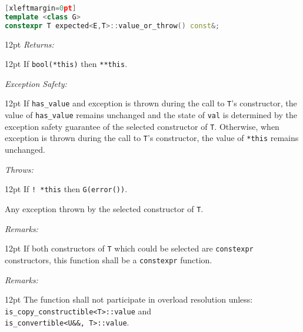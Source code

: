 \documentclass[a4paper,10pt]{article}
\newcommand{\cpp}[1]{\lstinline{#1}}
\newcommand{\wordingItem}[1]{\noindent\textit{#1:}}
\newenvironment{wordingTextItem}[1]{\wordingItem{#1}\vspace{2pt}\noindent\begin{adjustwidth}{12pt}{}}{\vspace{2pt}\end{adjustwidth}}
\newenvironment{wordingPara}{\begin{adjustwidth}{12pt}{}}{\end{adjustwidth}}
\begin{document}
\begin{lstlisting}[language=C++][xleftmargin=0pt]
template <class G>
constexpr T expected<E,T>::value_or_throw() const&; 
\end{lstlisting}
\begin{wordingPara}
\begin{wordingTextItem}{Returns}
If \cpp{bool(*this)} then \cpp{**this}.
\end{wordingTextItem}
\begin{wordingTextItem}{Exception Safety}
If \cpp{has_value} and exception is thrown during the call to \cpp{T}'s constructor, the value of \cpp{has_value} remains unchanged and the state of \cpp{val} is determined by the exception safety guarantee of the selected constructor of \cpp{T}. Otherwise, when exception is thrown during the call to \cpp{T}'s constructor, the value of \cpp{*this} remains unchanged.
\end{wordingTextItem}
\begin{wordingTextItem}{Throws}
If \cpp{! *this} then \cpp{G(error())}.

\noindent
Any exception thrown by the selected constructor of \cpp{T}.
\end{wordingTextItem}
\begin{wordingTextItem}{Remarks}
If both constructors of \cpp{T} which could be selected are \cpp{constexpr} constructors, this function shall be a \cpp{constexpr} function.
\end{wordingTextItem}
\begin{wordingTextItem}{Remarks}
The function shall not participate in overload resolution unless: \\
\cpp{is_copy_constructible<T>::value} and \\
\cpp{is_convertible<U&&, T>::value}.
\end{wordingTextItem}
\end{wordingPara}
\end{document}
